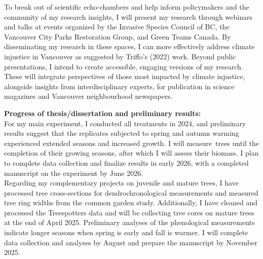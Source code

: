 \documentclass[11pt,letter]{article}
\begin{document}
To break out of scientific echo-chambers and help inform policymakers and the community of my research insights, I will present my research through webinars and talks at events organized by the Invasive Species Council of BC, the Vancouver City Parks Restoration Group, and Green Teams Canada. By disseminating my research in these spaces, I can more effectively address climate injustice in Vancouver as suggested by Triffo’s (2022) work.  \citep{triffo_green_2022} Beyond public presentations, I  intend to create accessible, engaging versions of my research. These will integrate perspectives of those most impacted by climate injustice, alongside insights from interdisciplinary experts, for publication in science magazines and Vancouver neighbourhood newspapers.
\par
\textbf{Progress of thesis/dissertation and preliminary results:}\\ 
For my main experiment, I conducted all treatments in 2024, and preliminary results suggest that the replicates subjected to spring and autumn warming experienced extended seasons and increased growth. I will measure trees until the completion of their growing seasons, after which I will assess their biomass. I plan to complete data collection and finalize results in early 2026, with a completed manuscript on the experiment by June 2026.
\\
Regarding my complementary projects on juvenile and mature trees, I have processed tree cross-sections for dendrochronological measurements and measured tree ring widths from the common garden study. Additionally, I have cleaned and processed the Treespotters data and will be collecting tree cores on mature trees at the end of April 2025. Preliminary analyses of the phenological measurements indicate longer seasons when spring is early and fall is warmer. I will complete data collection and analyses by August and prepare the manuscript by November 2025.
\end{document}
